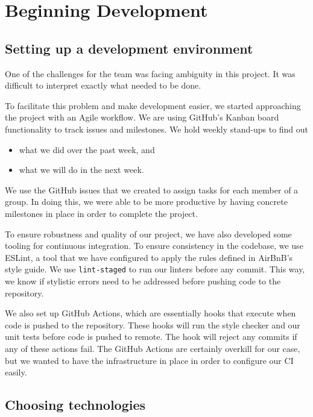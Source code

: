 \section{Beginning Development}

\subsection*{Setting up a development environment}

One of the challenges for the team was facing ambiguity in this project.
It was difficult to interpret exactly what needed to be done.

To facilitate this problem and make development easier,
we started approaching the project with an Agile workflow.
We are using GitHub's Kanban board functionality to track issues and milestones.
We hold weekly stand-ups to find out

\begin{itemize}
  \item what we did over the past week, and
  \item what we will do in the next week.
\end{itemize}

\noindent
We use the GitHub issues that we created to assign tasks for each member of a group.
In doing this, we were able to be more productive by having concrete milestones in place
in order to complete the project.

To ensure robustness and quality of our project,
we have also developed some tooling for continuous integration.
To ensure consistency in the codebase, we use ESLint, a tool that we have configured
to apply the rules defined in AirBnB's style guide.
We use \texttt{lint-staged} to run our linters before any commit. This way,
we know if stylistic errors need to be addressed before pushing code to the repository.

We also set up GitHub Actions, which are essentially hooks that execute when
code is pushed to the repository.
These hooks will run the style checker and our unit tests before code is pushed to remote.
The hook will reject any commits if any of these actions fail.
The GitHub Actions are certainly overkill for our case, but we wanted to have the infrastructure
in place in order to configure our CI easily.

\subsection*{Choosing technologies}

